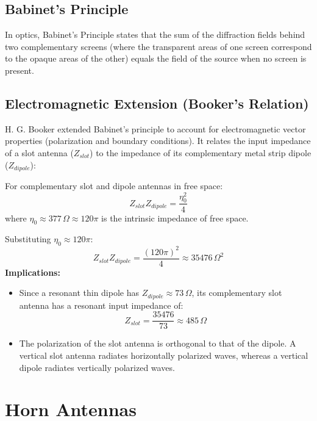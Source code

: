 \documentclass[12pt,a4paper]{article}
\begin{document}
\subsection{Babinet's Principle}
In optics, Babinet's Principle states that the sum of the diffraction fields behind two complementary screens (where the transparent areas of one screen correspond to the opaque areas of the other) equals the field of the source when no screen is present.

\subsection{Electromagnetic Extension (Booker's Relation)}
H. G. Booker extended Babinet's principle to account for electromagnetic vector properties (polarization and boundary conditions). It relates the input impedance of a slot antenna ($Z_{slot}$) to the impedance of its complementary metal strip dipole ($Z_{dipole}$):

\begin{tcolorbox}[formulabox, title={\textbf{Booker's Impedance Relation}}]
For complementary slot and dipole antennas in free space:
\[
Z_{slot} Z_{dipole} = \frac{\eta_0^2}{4}
\]
where $\eta_0 \approx 377\,\Omega \approx 120\pi$ is the intrinsic impedance of free space.
\end{tcolorbox}

Substituting $\eta_0 \approx 120\pi$:
\[
Z_{slot} Z_{dipole} = \frac{(120\pi)^2}{4} \approx 35476\,\Omega^2
\]
\textbf{Implications:}
\begin{itemize}[leftmargin=*, itemsep=3pt]
  \item Since a resonant thin dipole has $Z_{dipole} \approx 73\,\Omega$, its complementary slot antenna has a resonant input impedance of:
  \[
  Z_{slot} = \frac{35476}{73} \approx 485\,\Omega
  \]
  \item The polarization of the slot antenna is orthogonal to that of the dipole. A vertical slot antenna radiates horizontally polarized waves, whereas a vertical dipole radiates vertically polarized waves.
\end{itemize}

\section{Horn Antennas}
\end{document}
